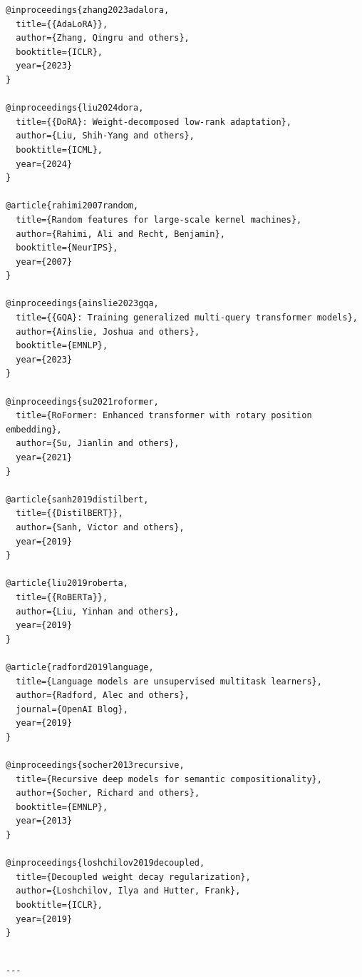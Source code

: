 \begin{lstlisting}
@inproceedings{zhang2023adalora,
  title={{AdaLoRA}},
  author={Zhang, Qingru and others},
  booktitle={ICLR},
  year={2023}
}

@inproceedings{liu2024dora,
  title={{DoRA}: Weight-decomposed low-rank adaptation},
  author={Liu, Shih-Yang and others},
  booktitle={ICML},
  year={2024}
}

@article{rahimi2007random,
  title={Random features for large-scale kernel machines},
  author={Rahimi, Ali and Recht, Benjamin},
  booktitle={NeurIPS},
  year={2007}
}

@inproceedings{ainslie2023gqa,
  title={{GQA}: Training generalized multi-query transformer models},
  author={Ainslie, Joshua and others},
  booktitle={EMNLP},
  year={2023}
}

@inproceedings{su2021roformer,
  title={RoFormer: Enhanced transformer with rotary position embedding},
  author={Su, Jianlin and others},
  year={2021}
}

@article{sanh2019distilbert,
  title={{DistilBERT}},
  author={Sanh, Victor and others},
  year={2019}
}

@article{liu2019roberta,
  title={{RoBERTa}},
  author={Liu, Yinhan and others},
  year={2019}
}

@article{radford2019language,
  title={Language models are unsupervised multitask learners},
  author={Radford, Alec and others},
  journal={OpenAI Blog},
  year={2019}
}

@inproceedings{socher2013recursive,
  title={Recursive deep models for semantic compositionality},
  author={Socher, Richard and others},
  booktitle={EMNLP},
  year={2013}
}

@inproceedings{loshchilov2019decoupled,
  title={Decoupled weight decay regularization},
  author={Loshchilov, Ilya and Hutter, Frank},
  booktitle={ICLR},
  year={2019}
}
\end{lstlisting}
\begin{lstlisting}

---
\end{lstlisting}